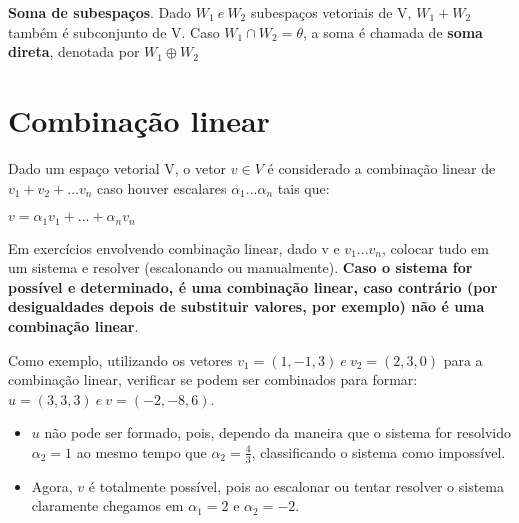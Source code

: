 \documentclass[letterpaper, 11pt]{article}
\begin{document}
\textbf{Soma de subespaços}. Dado \(W_1 \  e \  W_2\) subespaços vetoriais de V, \(W_1 + W_2\) também é subconjunto de V. Caso \(W_1 \cap W_2 = \theta\), a soma é chamada de \textbf{soma direta}, denotada por \(W_1 \oplus W_2\)


\section{Combinação linear}
\label{sec:org85c55fe}
Dado um espaço vetorial V, o vetor \(v \in V\) é considerado a combinação linear de \(v_1 + v_2 + ... v_n\) caso houver escalares \(\alpha_1 ... \alpha_n\) tais que:

\begin{center} $v = \alpha_1v_1 + ... + \alpha_nv_n$ \end{center}

Em exercícios envolvendo combinação linear, dado v e \(v_1 ... v_n\), colocar tudo em um sistema e resolver (escalonando ou manualmente). \textbf{Caso o sistema for possível e determinado, é uma combinação linear,
caso contrário (por desigualdades depois de substituir valores, por exemplo) não é uma combinação linear}.

Como exemplo, utilizando os vetores \(v_1 = (1,-1,3) \ e \ v_2 = (2,3,0)\) para a combinação linear, verificar se podem ser combinados para formar: \(u = (3,3,3) \ e \ v=(-2,-8,6)\).

\begin{itemize}
\item \(u\) não pode ser formado, pois, dependo da maneira que o sistema for resolvido \(\alpha_2 = 1\) ao mesmo tempo que \(\alpha_2 = \frac{4}{3}\), classificando o sistema como impossível.

\item Agora, \(v\) é totalmente possível, pois ao escalonar ou tentar resolver o sistema claramente chegamos em \(\alpha_1 = 2\) e \(\alpha_2 = -2\).
\end{itemize}
\end{document}
